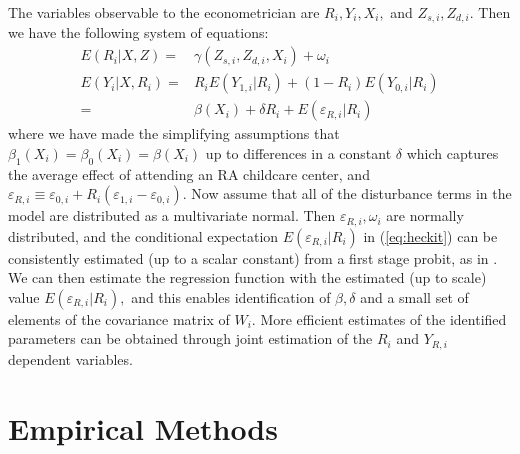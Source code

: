 \documentclass[12pt]{article}
\begin{document}
\bigskip

The variables observable to the econometrician are $R_{i},Y_{i},X_{i},$ and $Z_{s,i},Z_{d,i}$. Then we have the following system of equations:%
\begin{align}
E(R_{i}|X,Z)        =&  \gamma \left( Z_{s,i}, Z_{d,i}, X_{i} \right) + \omega_{i}  \label{eq:1stage} \\

E(Y_{i} |X,R_{i})   =& R_{i} E(Y_{1,i}| R_{i}) + (1-R_{i}) E(Y_{0,i}| R_{i}) \nonumber \\

   =& \beta(X_{i}) + \delta R_{i} + E(\varepsilon_{R,i}| R_{i}) \label{eq:heckit}

\end{align}
where we have made the simplifying assumptions that $\beta_{1}(X_{i})=\beta_{0}(X_{i})=\beta(X_{i})$ up to differences in a constant $\delta$ which captures the average effect of attending an RA childcare center, and $\varepsilon_{R,i} \equiv \varepsilon_{0,i} +R_{i} (\varepsilon_{1,i}-\varepsilon_{0,i})$.
Now assume that all of the disturbance terms in the model are distributed as a multivariate normal. Then $\varepsilon_{R,i}, \omega_{i}$ are normally distributed, and the conditional expectation $E(\varepsilon_{R,i}|R_{i})$ in (\ref{eq:heckit}) can be consistently estimated (up to a scalar constant) from a first stage probit, as in \cite{Heckman1979}. We can then estimate the regression function with the estimated (up to scale) value $E(\varepsilon_{R,i}|R_{i}),$ and this enables identification of $\beta,\delta$ and a small set of elements of the covariance matrix of $W_{i}.$ More efficient estimates of the identified parameters can be obtained through joint estimation of the $R_{i}$ and $Y_{R,i}$ dependent variables.

%

\section{Empirical Methods} \label{sec:method}
\end{document}
